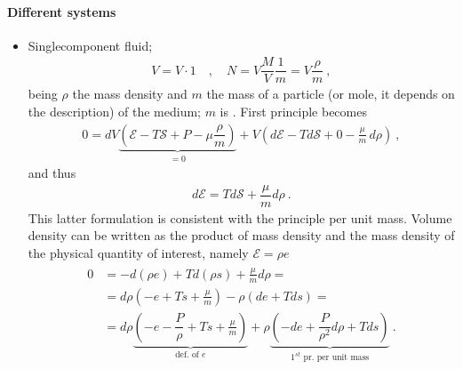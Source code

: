 \documentclass[letterpaper,10pt,english]{jupyterBook}
\begin{document}
\paragraph{Different systems}
\label{\detokenize{ch/potentials:id3}}\begin{itemize}
\item {} 
\sphinxAtStartPar
Single\sphinxhyphen{}component fluid;
\begin{equation*}
\begin{split}V = V \cdot 1 \quad , \quad N = V \dfrac{M}{V} \dfrac{1}{m} = V \dfrac{\rho}{m} \ , \end{split}
\end{equation*}
\sphinxAtStartPar
being \(\rho\) the mass density and \(m\) the mass of a particle (or mole, it depends on the description) of the medium; \(m\) is . First principle becomes
\begin{equation*}
\begin{split}0 = d V \underbrace{\left( \mathcal{E} - T \mathcal{S} + P - \mu \dfrac{\rho}{m} \right)}_{= 0} + V \left( d \mathcal{E} - T d\mathcal{S} + 0 - \frac{\mu}{m} \, d \rho  \right) \ ,\end{split}
\end{equation*}
\sphinxAtStartPar
and thus
\begin{equation*}
\begin{split}d \mathcal{E} = T d \mathcal{S} + \dfrac{\mu}{m} d \rho \ .\end{split}
\end{equation*}
\sphinxAtStartPar
This latter formulation is consistent with the principle per unit mass. Volume density can be written as the product of mass density and the mass density of the physical quantity of interest, namely \(\mathcal{E} = \rho e\)
\begin{equation*}
\begin{split}\begin{aligned}
    0 & = - d( \rho e ) + T d (\rho s) + \frac{\mu}{m} d \rho = \\
      & = d \rho \left( - e + T s + \frac{\mu}{m} \right) - \rho \left( d e + T d s \right) = \\
      & = d \rho \underbrace{\left( - e - \dfrac{P}{\rho} + T s + \frac{\mu}{m} \right)}_{\text{def. of $e$}} + \rho \underbrace{\left( - d e + \dfrac{P}{\rho^2} d \rho + T d s \right)}_{1^{st} \text{ pr. per unit mass}} \ .
  \end{aligned}\end{split}
\end{equation*}

\end{itemize}
\end{document}
